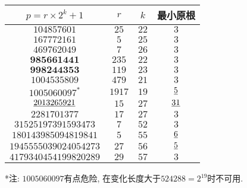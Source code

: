 \begin{tabular}{|c|c|c|c|}
	\hline $p = r \times 2 ^ k + 1$ &  $r$  & $k$  & 最小原根 \\
	\hline $104857601$              &  $25$ & $22$ & $3$ \\
	\hline $167772161$              &  $5$  & $25$ & $3$ \\
     \hline $469762049$      &  $7$   &  $26$  &    $3$ \\
     \hline $\mathbf{985661441}$      & $235$  &  $22$  &    $3$ \\
  \hline $\mathbf{998244353}$    & $119$  &  $23$  &    $3$ \\
  \hline $1004535809$    & $479$  &  $21$  &    $3$ \\
  \hline $1005060097 ^ *$      & $1917$ &  $19$  &  $\emph{5}$ \\
  \hline $\emph{2013265921}$    &  $15$  &  $27$  &  $\emph{31}$ \\
    \hline $2281701377$      &  $17$  &  $27$  &    $3$ \\
 \hline $31525197391593473$  &  $7$   &  $52$  &    $3$ \\
\hline $180143985094819841$  &  $5$   &  $55$  &  $\emph{6}$ \\
\hline $1945555039024054273$ &  $27$  &  $56$  &  $\emph{5}$ \\
\hline $4179340454199820289$ &  $29$  &  $57$  &    $3$ \\
\hline
\end{tabular}

*注: $1005060097$有点危险, 在变化长度大于$524288 = 2 ^ {19}$时不可用.